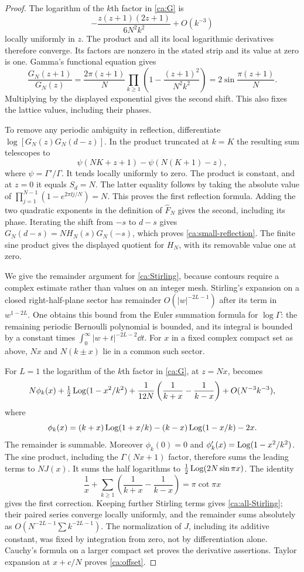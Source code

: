 \begin{proof}
The logarithm of the $k$th factor in \eqref{ca:G} is
\[
 -\frac{z(z+1)(2z+1)}{6N^2k^2}+O(k^{-3})
\]
locally uniformly in $z$. The product and all its local logarithmic derivatives therefore converge. Its factors are nonzero in the stated strip and its value at zero is one. Gamma's functional equation gives
\[
 \frac{G_N(z+1)}{G_N(z)}
 =\frac{2\pi(z+1)}N
  \prod_{k\ge1}\left(1-\frac{(z+1)^2}{N^2k^2}\right)
 =2\sin\frac{\pi(z+1)}N.
\]
Multiplying by the displayed exponential gives the second shift. This also fixes the lattice values, including their phases.

To remove any periodic ambiguity in reflection, differentiate
$\log[G_N(z)G_N(d-z)]$. In the product truncated at $k=K$ the resulting sum telescopes to
\[
 \psi(NK+z+1)-\psi(N(K+1)-z),
\]
where $\psi=\Gamma'/\Gamma$. It tends locally uniformly to zero. The product is constant, and at $z=0$ it equals $S_d=N$. The latter equality follows by taking the absolute value of
$\prod_{j=1}^{N-1}(1-e^{2\pi\ii j/N})=N$.
This proves the first reflection formula. Adding the two quadratic
exponents in the definition of $\widehat F_N$ gives the second,
including its phase. Iterating the shift from $-s$ to $d-s$ gives
$G_N(d-s)=N H_N(s)G_N(-s)$, which proves \eqref{ca:small-reflection}. The finite sine product gives the displayed quotient for $H_N$, with its removable value one at zero.

We give the remainder argument for \eqref{ca:Stirling}, because contours require a complex estimate rather than values on an integer mesh. Stirling's expansion on a closed right-half-plane sector has remainder $O(|w|^{-2L-1})$ after its term in $w^{1-2L}$. One obtains this bound from the Euler summation formula for $\log\Gamma$: the remaining periodic Bernoulli polynomial is bounded, and its integral is bounded by a constant times
$\int_0^\infty|w+t|^{-2L-2}\dd t$.
For $x$ in a fixed complex compact set as above, $Nx$ and
$N(k\pm x)$ lie in a common such sector.

For $L=1$ the logarithm of the $k$th factor in \eqref{ca:G}, at $z=Nx$, becomes
\[
 N\phi_k(x)+\tfrac12\operatorname{Log}(1-x^2/k^2)
 +\frac1{12N}\left(\frac1{k+x}-\frac1{k-x}\right)
 +O(N^{-3}k^{-3}),
\]
where
\[
 \phi_k(x)=(k+x)\operatorname{Log}(1+x/k)
 -(k-x)\operatorname{Log}(1-x/k)-2x.
\]
The remainder is summable. Moreover $\phi_k(0)=0$ and
$\phi_k'(x)=\operatorname{Log}(1-x^2/k^2)$. The sine product, including the
$\Gamma(Nx+1)$ factor, therefore sums the leading terms to $NJ(x)$.
It sums the half logarithms to $\frac12\operatorname{Log}(2N\sin\pi x)$.
The identity
\[
 \frac1x+\sum_{k\ge1}
   \left(\frac1{k+x}-\frac1{k-x}\right)=\pi\cot\pi x
\]
gives the first correction. Keeping further Stirling terms gives
\eqref{ca:all-Stirling}; their paired series converge locally uniformly, and the remainder sums absolutely as
$O(N^{-2L-1}\sum k^{-2L-1})$. The normalization of $J$, including its additive constant, was fixed by integration from zero, not by differentiation alone. Cauchy's formula on a larger compact set proves the derivative assertions. Taylor expansion at $x+c/N$ proves \eqref{ca:offset}.
\end{proof}

